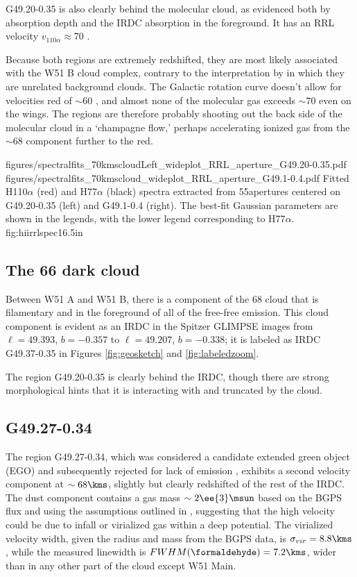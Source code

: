 G49.20-0.35 is also clearly behind the molecular cloud, as evidenced both by
\formaldehyde absorption depth and the IRDC absorption in the foreground.
It has an RRL velocity $v_{110\alpha} \approx 70$ \kms.

Because both \hii regions are extremely redshifted, they are most likely
associated with the W51 B cloud complex, contrary to the interpretation by
\citet{Tian2013a} in which they are unrelated background clouds.  The Galactic
rotation curve doesn't allow for velocities red of $\sim60$ \kms, and almost
none of the molecular gas exceeds $\sim70$ \kms even on the wings.  The \hii
regions are therefore probably shooting out the back side of the molecular
cloud in a `champagne flow,' perhaps accelerating ionized gas from the $\sim
68$ \kms component
further to the red.

\FigureTwoAA
{figures/spectralfits_70kmscloudLeft_wideplot_RRL_aperture_G49.20-0.35.pdf}
{figures/spectralfits_70kmscloud_wideplot_RRL_aperture_G49.1-0.4.pdf}
{Fitted H110$\alpha$ (red) and H77$\alpha$ (black) spectra extracted from
55\arcsec apertures centered on G49.20-0.35 (left) and G49.1-0.4 (right).
The best-fit Gaussian parameters are shown in the legends, with the lower
legend corresponding to H77$\alpha$.}
{fig:hiirrlspec}{1}{6.5in}

\subsection{The 66  \um dark cloud}
Between W51 A and W51 B, there is a component of the 68 \kms cloud that is
filamentary and in the foreground of all of the free-free emission.
This cloud component is evident as an IRDC in the Spitzer GLIMPSE images from
$\ell=49.393$, $b=-0.357$ to $\ell=49.207$, $b=-0.338$; it is labeled as IRDC
G49.37-0.35 in Figures \ref{fig:geosketch} and \ref{fig:labeledzoom}.

The \hii region G49.20-0.35 is clearly behind the IRDC, though there are strong
morphological hints that it is interacting with and truncated by the cloud.

\subsection{G49.27-0.34}
The \uchii region G49.27-0.34, which was considered a candidate extended green
object (EGO) and subsequently rejected for lack of \hh emission
\citep{De-Buizer2010a,Lee2013a}, exhibits a second velocity component at $\sim68
\kms$, slightly but clearly redshifted of the rest of the IRDC.  The dust
component contains a gas mass $\sim2\ee{3} \msun$ based on the BGPS flux and
using the assumptions
outlined in \citet{Aguirre2011a}, suggesting that the high velocity could be
due to infall or virialized gas within a deep potential.  The virialized
velocity width, given the radius and mass from the BGPS data, is
$\sigma_{vir}=8.8 \kms$, while the measured \formaldehyde linewidth is
$FWHM(\formaldehyde) = 7.2 \kms$, wider than in any other part of the cloud
except W51 Main.

